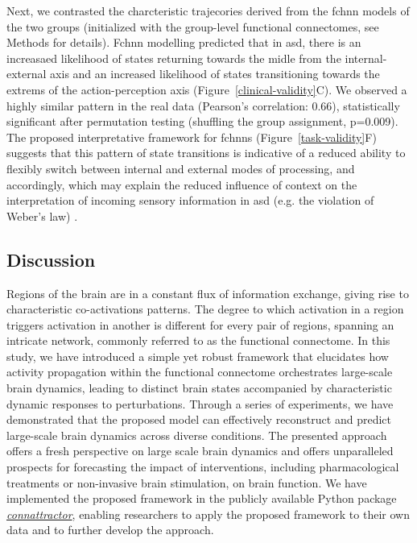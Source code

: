 \documentclass{article}
\begin{document}
Next, we contrasted the charcteristic trajecories derived from the \acrshort{fchnn} models of the two groups (initialized with the group-level functional connectomes, see Methods for details). Fc\acrshort{hnn} modelling predicted that in \acrshort{asd}, there is an increasaed likelihood of states returning towards the mi\acrshort{dl}e from the internal-external axis and an increased likelihood of states transitioning towards the extrems of the action-perception axis (Figure~\ref{clinical-validity}C). We observed a highly similar pattern in the real data (Pearson's correlation: 0.66), statistically significant after permutation testing (shuffling the group assignment, p=0.009).
The proposed interpretative framework for \acrshort{fchnn}s (Figure~\ref{task-validity}F) suggests that this pattern of state transitions is indicative of a reduced ability to flexibly switch between internal and external modes of processing, and accordingly, which may explain the reduced influence of context on the interpretation of incoming sensory information in \acrshort{asd} (e.g. the violation of Weber's law) \citep{hadad2019perception}.

\subsection{Discussion}\label{Discussion}

Regions of the brain are in a constant flux of information exchange, giving rise to characteristic co-activations patterns.
The degree to which activation in a region triggers activation in another is different for every pair of regions, spanning an intricate network, commonly referred to as the functional connectome.
In this study, we have introduced a simple yet robust framework that elucidates how activity propagation within the functional connectome orchestrates large-scale brain dynamics, leading to distinct brain states accompanied by characteristic dynamic responses to perturbations.
Through a series of experiments, we have demonstrated that the proposed model can effectively reconstruct and predict large-scale brain dynamics across diverse conditions.
The presented approach offers a fresh perspective on large scale brain dynamics and offers unparalleled prospects for forecasting the impact of interventions, including pharmacological treatments or non-invasive brain stimulation, on brain function.
We have implemented the proposed framework in the publicly available Python package \href{https://pni-lab.github.io/connattractor/quickstart}{\textit{connattractor}}, enabling researchers to apply the proposed framework to their own data and to further develop the approach.
\end{document}

